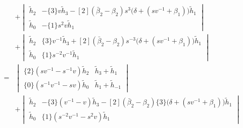 \begin{example}
\begin{align*}
&+
\begin{vmatrix}
\tilde{h}_2 & - \{3\} v \tilde{h}_3 - [2] ( \bar{\beta}_2 - \beta_2 ) s^3 \big( \delta + (s v^{-1} + \beta_{1} ) \big) \tilde{h}_1 \\
\tilde{h}_0 & - \{1\} s^2 v \tilde{h}_{1}
\end{vmatrix}\\
&+
\begin{vmatrix}
\tilde{h}_2 & \{3\} v^{-1} \tilde{h}_{3} + [2] ( \bar{\beta}_2 - \beta_2 ) s^{-3} \big( \delta + ( s v^{-1} + \beta_{1} ) \big) \tilde{h}_{1} \\
\tilde{h}_0 & \{1\} s^{-2} v^{-1} \tilde{h}_{1}
\end{vmatrix} \\
=& 
\begin{vmatrix}
\{2\} ( s v^{-1} - s^{-1} v ) \tilde{h}_2 &  \tilde{h}_3 + \tilde{h}_1 \\
\{0\} ( s^{-1} v^{-1} - s v ) \tilde{h}_0 & \tilde{h}_1 + \tilde{h}_{-1}
\end{vmatrix}\\
&+
\begin{vmatrix}
\tilde{h}_2 & - \{3\} ( v^{-1} - v ) \tilde{h}_3 - [2] ( \bar{\beta}_2 - \beta_2 ) \{3\} \big( \delta + (s v^{-1} + \beta_{1} ) \big) \tilde{h}_1 \\
\tilde{h}_0 & \{1\} ( s^{-2} v^{-1} - s^2 v ) \tilde{h}_{1}
\end{vmatrix} 
\end{align*}
\end{example}

